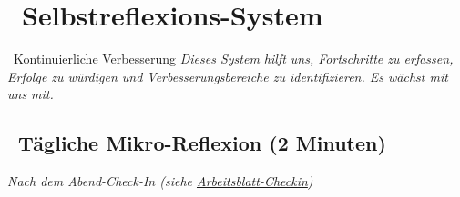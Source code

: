 \newpage
\section*{\textcolor{ctmmPurple}{\faChartLine~Selbstreflexions-System}}
\label{sec:feedback}

\begin{ctmmPurpleBox}{\faSync~Kontinuierliche Verbesserung}
\textit{Dieses System hilft uns, Fortschritte zu erfassen, Erfolge zu würdigen und Verbesserungsbereiche zu identifizieren. Es wächst mit uns mit.}
\end{ctmmPurpleBox}

\subsection*{\faCalendar~Tägliche Mikro-Reflexion (2 Minuten)}
\textit{Nach dem Abend-Check-In (siehe \hyperref[sec:checkin]{Arbeitsblatt-Checkin})}

